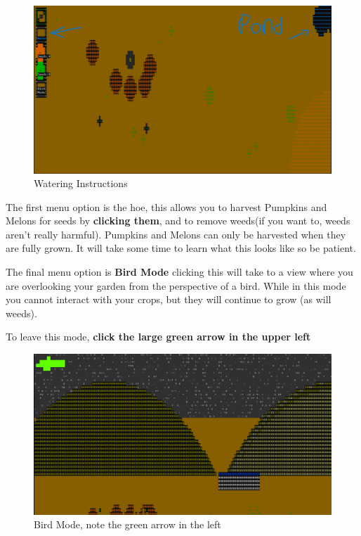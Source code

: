 \documentclass{article}
\begin{document}
    \begin{figure}[H]
    \includegraphics[width=\textwidth]{watering.png }
    \caption{Watering Instructions}
        
    \end{figure}

The first menu option is the hoe, this allows you to harvest Pumpkins and Melons for seeds by \textbf{clicking them}, and to remove weeds(if you want to, weeds aren't really harmful). Pumpkins and Melons can only be harvested when they are fully grown. It will take some time to learn what this looks like so be patient.

The final menu option is \textbf{Bird Mode} clicking this will take to a view where you are overlooking your garden from the perspective of a bird. While in this mode you cannot interact with your crops, but they will continue to grow (as will weeds).

To leave this mode, \textbf{click the large green arrow in the upper left}
    \begin{figure}[H]
    \includegraphics[width=\textwidth]{Screenshot 2025-06-05 105052.png}
    \caption{Bird Mode, note the green arrow in the left}
        
    \end{figure}
\end{document}
